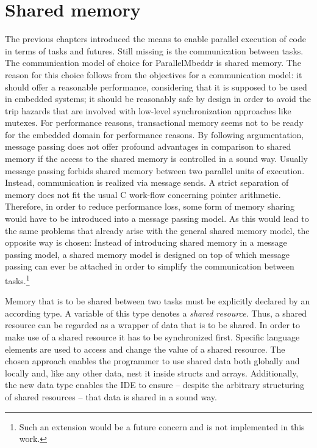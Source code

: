 \section{Shared memory}
\label{sharedMemory}
The previous chapters introduced the means to enable parallel execution of code in terms of tasks and futures. Still missing is the communication between tasks. The communication model of choice for ParallelMbeddr is shared memory. The reason for this choice follows from the objectives for a communication model: it should offer a reasonable performance, considering that it is supposed to be used in embedded systems; it should be reasonably safe by design in order to avoid the trip hazards that are involved with low-level synchronization approaches like mutexes. For performance reasons, transactional memory seems not to be ready for the embedded domain for performance reasons. By following argumentation, message passing does not offer profound advantages in comparison to shared memory if the access to the shared memory is controlled in a sound way. Usually message passing forbids shared memory between two parallel units of execution. Instead, communication is realized via message sends. A strict separation of memory does not fit the usual C work-flow concerning pointer arithmetic. Therefore, in order to reduce performance loss, some form of memory sharing would have to be introduced into a message passing model. As this would lead to the same problems that already arise with the general shared memory model, the opposite way is chosen: Instead of introducing shared memory in a message passing model, a shared memory model is designed on top of which message passing can ever be attached in order to simplify the communication between tasks.\footnote{Such an extension would be a future concern and is not implemented in this work.}

Memory that is to be shared between two tasks must be explicitly declared by an according type. A variable of this type denotes a \textit{shared resource}. Thus, a shared resource can be regarded as a wrapper of data that is to be shared. In order to make use of a shared resource it has to be synchronized first. Specific language elements are used to access and change the value of a shared resource. The chosen approach enables the programmer to use shared data both globally and locally and, like any other data, nest it inside structs and arrays. Additionally, the new data type enables the IDE to ensure -- despite the arbitrary structuring of shared resources -- that data is shared in a sound way.

